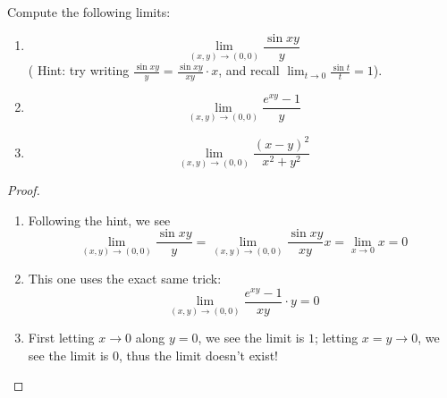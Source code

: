 \documentclass[openany]{book}
\begin{document}
\begin{prob}
    Compute the following limits:
    \begin{enumerate}
        \item \begin{equation*}
            \lim_{(x,y)\to (0,0)}\frac{\sin xy}{y}
        \end{equation*}
       ( Hint: try writing $\frac{\sin xy}{y}=\frac{\sin xy}{xy}\cdot x$, and recall $\lim_{t\to 0}\frac{\sin t}{t}=1$).
        \item \begin{equation*}
            \lim_{(x,y)\to(0,0)}\frac{e^{xy}-1}{y}
        \end{equation*}
        \item \begin{equation*}
            \lim_{(x,y)\to(0,0)}\frac{(x-y)^2}{x^2+y^2}
        \end{equation*}
    \end{enumerate}
\end{prob}
\begin{proof}
    \begin{enumerate}
        \item Following the hint, we see 
        \begin{equation*}
            \lim_{(x,y)\to(0,0)}\frac{\sin xy}{y}=\lim_{(x,y)\to(0,0)}\frac{\sin xy}{xy}x=\lim_{x\to 0}x=0
        \end{equation*}
        \item This one uses the exact same trick: \begin{equation*}
            \lim_{(x,y)\to(0,0)}\frac{e^{xy}-1}{xy}\cdot y=0
        \end{equation*}
        \item First letting $x\to 0$ along $y=0$, we see the limit is $1$; letting $x=y\to 0$, we see the limit is $0$, thus the limit doesn't exist!
    \end{enumerate}
\end{proof}
\end{document}
